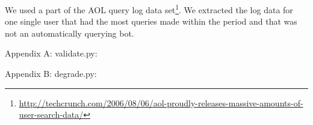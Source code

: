 \documentclass[a4paper,12pt,oneside,fleqn]{article}
\begin{document}



We used a part of the AOL query log data
set\footnote{\href{http://techcrunch.com/2006/08/06/aol-proudly-releases-massive-amounts-of-user-search-data/}{http://techcrunch.com/2006/08/06/aol-proudly-releases-massive-amounts-of-user-search-data/}}. We
extracted the log data for one single user that had the most queries
made within the period and that was not an automatically querying bot.

\clearpage
\nocite{*}



\lstset{
language=Python,
basicstyle=\footnotesize\ttfamily,
numbers=left,
numberstyle=\tiny,
numberstyle=\footnotesize,
showstringspaces=false
}

\clearpage
Appendix A: validate.py:


\clearpage
Appendix B: degrade.py:

\end{document}
